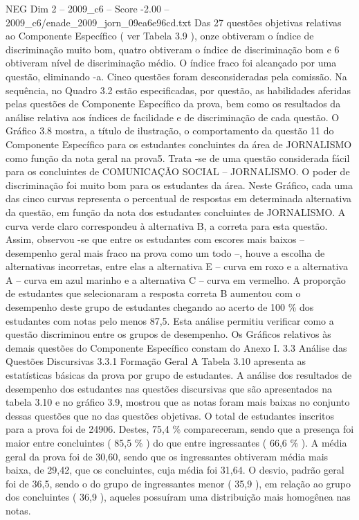 \begin{textsample}{NEG Dim 2 – 2009\_c6 – Score -2.00 – 2009\_c6/enade\_2009\_jorn\_09ea6e96cd.txt}
Das 27 questões objetivas relativas ao Componente Específico ( ver Tabela 3.9 ), onze obtiveram o índice de discriminação muito bom, quatro obtiveram o índice de discriminação bom e 6 obtiveram nível de discriminação médio.
O índice fraco foi alcançado por uma questão, eliminando -a.
Cinco questões foram desconsideradas pela comissão.
Na sequência, no Quadro 3.2 estão especificadas, por questão, as habilidades aferidas pelas questões de Componente Específico da prova, bem como os resultados da análise relativa aos índices de facilidade e de discriminação de cada questão.
O Gráfico 3.8 mostra, a título de ilustração, o comportamento da questão 11 do Componente Específico para os estudantes concluintes da área de JORNALISMO como função da nota geral na prova5.
Trata -se de uma questão considerada fácil para os concluintes de COMUNICAÇÃO SOCIAL – JORNALISMO.
O poder de discriminação foi muito bom para os estudantes da área.
Neste Gráfico, cada uma das cinco curvas representa o percentual de respostas em determinada alternativa da questão, em função da nota dos estudantes concluintes de JORNALISMO.
A curva verde claro correspondeu à alternativa B, a correta para esta questão.
Assim, observou -se que entre os estudantes com escores mais baixos – desempenho geral mais fraco na prova como um todo –, houve a escolha de alternativas incorretas, entre elas a alternativa E – curva em roxo e a alternativa A – curva em azul marinho e a alternativa C – curva em vermelho.
A proporção de estudantes que selecionaram a resposta correta B aumentou com o desempenho deste grupo de estudantes chegando ao acerto de 100 \% dos estudantes com notas pelo menos 87,5.
Esta análise permitiu verificar como a questão discriminou entre os grupos de desempenho.
Os Gráficos relativos às demais questões do Componente Específico constam do Anexo I. 3.3 Análise das Questões Discursivas 3.3.1 Formação Geral A Tabela 3.10 apresenta as estatísticas básicas da prova por grupo de estudantes.
A análise dos resultados de desempenho dos estudantes nas questões discursivas que são apresentados na tabela 3.10 e no gráfico 3.9, mostrou que as notas foram mais baixas no conjunto dessas questões que no das questões objetivas.
O total de estudantes inscritos para a prova foi de 24906.
Destes, 75,4 \% compareceram, sendo que a presença foi maior entre concluintes ( 85,5 \% ) do que entre ingressantes ( 66,6 \% ).
A média geral da prova foi de 30,60, sendo que os ingressantes obtiveram média mais baixa, de 29,42, que os concluintes, cuja média foi 31,64.
O desvio, padrão geral foi de 36,5, sendo o do grupo de ingressantes menor ( 35,9 ), em relação ao grupo dos concluintes ( 36,9 ), aqueles possuíram uma distribuição mais homogênea nas notas.

\end{textsample}
